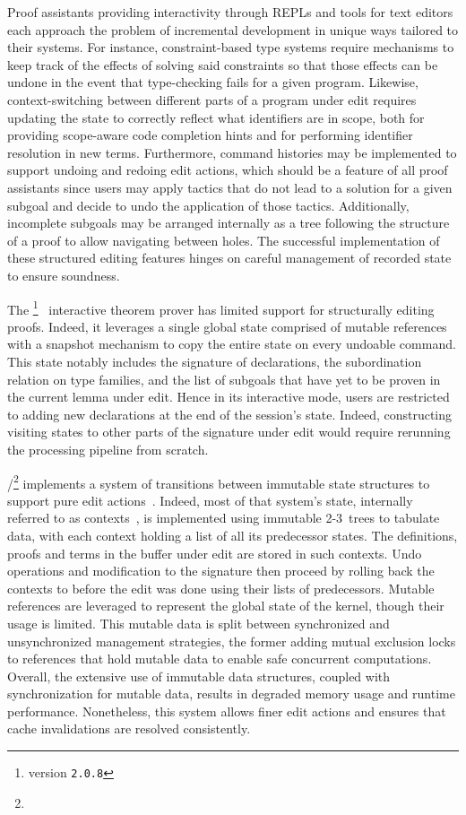 Proof assistants providing interactivity through \acp{REPL} and tools for text editors each approach the problem of incremental development in unique ways tailored to their systems.
For instance, constraint-based type systems require mechanisms to keep track of the effects of solving said constraints so that those effects can be undone in the event that type-checking fails for a given program.
Likewise, context-switching between different parts of a program under edit requires updating the state to correctly reflect what identifiers are in scope, both for providing scope-aware code completion hints and for performing identifier resolution in new terms.
Furthermore, command histories may be implemented to support undoing and redoing edit actions, which should be a feature of all proof assistants since users may apply tactics that do not lead to a solution for a given subgoal and decide to undo the application of those tactics.
Additionally, incomplete subgoals may be arranged internally as a tree following the structure of a proof to allow navigating between holes.
The successful implementation of these structured editing features hinges on careful management of recorded state to ensure soundness.

The \Abella\footnote{\Abella version \texttt{2.0.8}}~\cite{baelde2014abella} interactive theorem prover has limited support for structurally editing proofs.
Indeed, it leverages a single global state comprised of mutable references with a snapshot mechanism to copy the entire state on every undoable command.
This state notably includes the signature of declarations, the subordination relation on type families, and the list of subgoals that have yet to be proven in the current lemma under edit.
Hence in its interactive mode, \Abella users are restricted to adding new declarations at the end of the session's state.
Indeed, constructing visiting states to other parts of the signature under edit would require rerunning the processing pipeline from scratch.

\Isabelle/\Isar\footnote{} implements a system of transitions between immutable state structures to support pure edit actions~\cite{wenzel2023isabelleimpl, wenzel2023isabelleisarref, wenzel2023isabellesys}.
Indeed, most of that system's state, internally referred to as contexts~\cite{ballarin2006interpretation}, is implemented using immutable 2-3~trees to tabulate data, with each context holding a list of all its predecessor states.
The definitions, proofs and terms in the buffer under edit are stored in such contexts.
Undo operations and modification to the signature then proceed by rolling back the contexts to before the edit was done using their lists of predecessors.
Mutable references are leveraged to represent the global state of the kernel, though their usage is limited.
This mutable data is split between synchronized and unsynchronized management strategies, the former adding mutual exclusion locks to references that hold mutable data to enable safe concurrent computations.
Overall, the extensive use of immutable data structures, coupled with synchronization for mutable data, results in degraded memory usage and runtime performance.
Nonetheless, this system allows finer edit actions and ensures that cache invalidations are resolved consistently.

